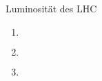 \documentclass{alex_hü}
\begin{document}
\begin{mybox}{Luminosität des LHC}
	\centering \(  \)
	\tcblower
	\begin{enumerate}
		\item \(  \)
	\tcbline
		\item \(  \)
	\tcbline
		\item \(  \)
	\end{enumerate}
\end{mybox}
\end{document}

